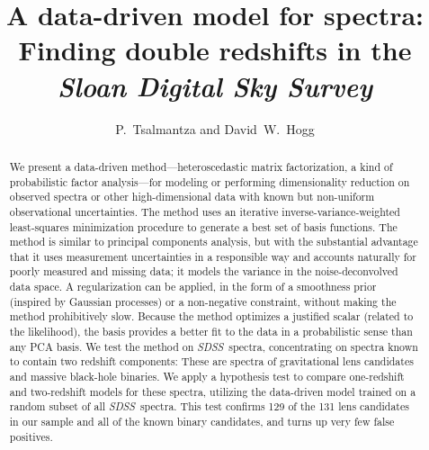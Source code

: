 \documentclass[12pt,preprint]{aastex}
\newcommand{\project}[1]{\textsl{#1}}
\newcommand{\sdss}{\project{SDSS}}
\newcommand{\SDSS}{\sdss}
\begin{document}
\sloppy


\title{A data-driven model for spectra:\\
       Finding double redshifts in the \project{Sloan Digital Sky Survey}}
\author{P.~Tsalmantza and David~W.~Hogg}

\begin{abstract}
We present a data-driven method---heteroscedastic matrix
factorization, a kind of probabilistic factor analysis---for modeling
or performing dimensionality reduction on observed spectra or other
high-dimensional data with known but non-uniform observational
uncertainties.  The method uses an iterative inverse-variance-weighted
least-squares minimization procedure to generate a best set of basis
functions.  The method is similar to principal components analysis,
but with the substantial advantage that it uses measurement
uncertainties in a responsible way and accounts naturally for poorly
measured and missing data; it models the variance in the
noise-deconvolved data space.  A regularization can be applied, in the
form of a smoothness prior (inspired by Gaussian processes) or a
non-negative constraint, without making the method prohibitively slow.
Because the method optimizes a justified scalar (related to the
likelihood), the basis provides a better fit to the data in a
probabilistic sense than any PCA basis.  We test the method on
\SDSS\ spectra, concentrating on spectra known to contain two redshift
components: These are spectra of gravitational lens candidates and
massive black-hole binaries. We apply a hypothesis test to
compare one-redshift and two-redshift models for these spectra,
utilizing the data-driven model trained on a random subset of all
\SDSS\ spectra.  This test confirms 129 of the 131 lens candidates in
our sample and all of the known binary candidates, and turns up very
few false positives.
\end{abstract}

\end{document}
